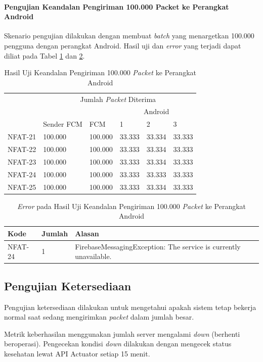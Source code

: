 \paragraph{Pengujian Keandalan Pengiriman 100.000 Packet ke Perangkat Android}
\par Skenario pengujian dilakukan dengan membuat \textit{batch} yang menargetkan 100.000 pengguna dengan perangkat Android. Hasil uji dan \textit{error} yang terjadi dapat diliat pada Tabel \ref{t:keandalan-android-100k} dan \ref{t:error-keandalan-android-100k}.
\begin{longtable}{|p{1.5cm}|p{2cm}|p{1.5cm}|p{1cm}|p{1cm}|p{1cm}|}
	\caption{Hasil Uji Keandalan Pengiriman 100.000 \textit{Packet} ke Perangkat Android} \label{t:keandalan-android-100k} \\ \hline
	\rowcolor{lightgray} & \multicolumn{5}{c|}{Jumlah \textit{Packet} Diterima} \\ \hhline{~|*5{-}|}
	\rowcolor{lightgray} & & & \multicolumn{3}{c|}{Android} \\ \hhline{~~~|*3{-}|}
	\rowcolor{lightgray} \multirow{-3}{*}{Kode} & \multirow{-2}{*}{Sender FCM} & \multirow{-2}{*}{FCM} & 1 & 2 & 3 \\ \hline
	NFAT-21 & 100.000 & 100.000 & 33.333 & 33.334 & 33.333 \\ \hline
	NFAT-22 & 100.000 & 100.000 & 33.333 & 33.334 & 33.333 \\ \hline
	NFAT-23 & 100.000 & 100.000 & 33.333 & 33.334 & 33.333 \\ \hline
	NFAT-24 & 100.000 & 100.000 & 33.333 & 33.333 & 33.333 \\ \hline
	NFAT-25 & 100.000 & 100.000 & 33.333 & 33.334 & 33.333 \\ \hline
\end{longtable}
\clearpage
\begin{longtable}{|p{1.5cm}|p{1.5cm}|p{5cm}|}
	\caption{\textit{Error} pada Hasil Uji Keandalan Pengiriman 100.000 \textit{Packet} ke Perangkat Android} \label{t:error-keandalan-android-100k} \\ \hline
	\rowcolor{lightgray} Kode & Jumlah & Alasan \\ \hline
	NFAT-24 & 1 & FirebaseMessagingException: The service is currently unavailable. \\ \hline
\end{longtable}

\subsection{Pengujian Ketersediaan}
\par Pengujian ketersediaan dilakukan untuk mengetahui apakah sistem tetap bekerja normal saat sedang mengirimkan \textit{packet} dalam jumlah besar.
\par Metrik keberhasilan menggunakan jumlah server mengalami \textit{down} (berhenti beroperasi). Pengecekan kondisi \textit{down} dilakukan dengan mengecek status kesehatan lewat API Actuator setiap 15 menit.


